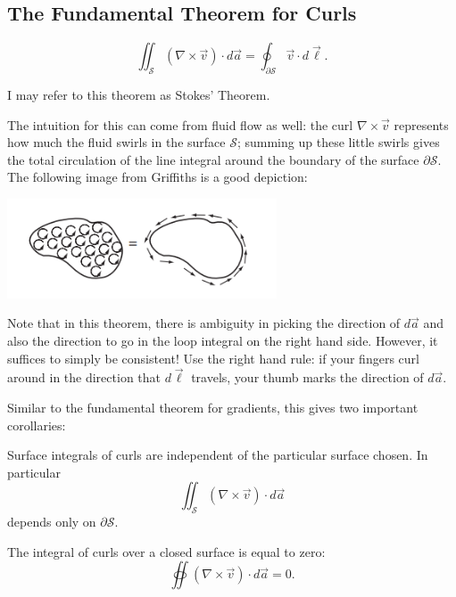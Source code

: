 \subsection{The Fundamental Theorem for Curls}

\begin{theorem}
    \[\iint_\mathcal{S}(\nabla\times\vec{v})\cdot d\vec{a}=\oint_{\partial \mathcal{S}}\vec{v}\cdot d\vec{\ell}.\]
\end{theorem}

I may refer to this theorem as Stokes' Theorem.

The intuition for this can come from fluid flow as well: the curl $\nabla\times\vec{v}$ represents how much the fluid swirls in the surface $\mathcal{S}$; summing up these little swirls gives the total circulation of the line integral around the boundary of the surface $\partial\mathcal{S}$. The following image from Griffiths is a good depiction:

\begin{center}
    \includegraphics[width=8cm]{Electrodynamics/images/stokes.PNG}
\end{center}

Note that in this theorem, there is ambiguity in picking the direction of $d\vec{a}$ and also the direction to go in the loop integral on the right hand side. However, it suffices to simply be consistent! Use the right hand rule: if your fingers curl around in the direction that $d\vec{\ell}$ travels, your thumb marks the direction of $d\vec{a}$.

Similar to the fundamental theorem for gradients, this gives two important corollaries:

\begin{corollary}
    Surface integrals of curls are independent of the particular surface chosen. In particular
    \[\iint_{\mathcal{S}}(\nabla\times\vec{v})\cdot d\vec{a}\]
    depends only on $\partial\mathcal{S}$.
\end{corollary}

\begin{corollary}
    The integral of curls over a closed surface is equal to zero:
    \[\oiint (\nabla\times\vec{v})\cdot d\vec{a}=0.\]
\end{corollary}

